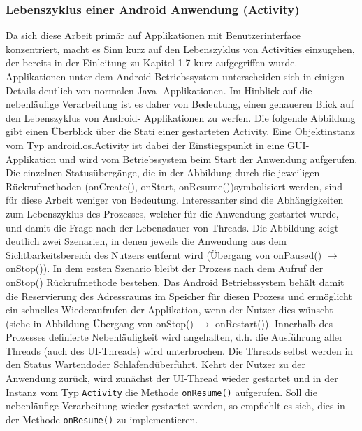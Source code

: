 \documentclass[12pt,oneside,a4paper,bibtotoc,liststotoc]{scrreprt}
\begin{document}
\subsubsection{Lebenszyklus einer Android Anwendung (Activity)}
Da sich diese Arbeit primär auf Applikationen mit Benutzerinterface konzentriert, macht es Sinn kurz auf den Lebenszyklus von Activities einzugehen, der bereits in der Einleitung zu Kapitel 1.7 kurz aufgegriffen wurde.
Applikationen unter dem Android Betriebssystem unterscheiden sich in einigen Details deutlich von normalen Java- Applikationen. Im Hinblick auf die nebenläufige Verarbeitung ist es daher von Bedeutung, einen genaueren Blick auf den Lebenszyklus von Android- Applikationen zu werfen. Die folgende Abbildung gibt einen Überblick über die Stati einer gestarteten Activity. Eine Objektinstanz vom Typ android.os.Activity ist dabei der Einstiegspunkt in eine GUI-Applikation und wird vom Betriebssystem beim Start der Anwendung aufgerufen. Die einzelnen Statusübergänge, die in der Abbildung durch die jeweiligen Rückrufmethoden (onCreate(), onStart, onResume())symbolisiert werden,  sind für diese Arbeit weniger von Bedeutung. Interessanter sind die Abhängigkeiten zum Lebenszyklus des Prozesses, welcher für die Anwendung gestartet wurde, und damit die Frage nach der Lebensdauer von Threads. Die Abbildung zeigt deutlich zwei Szenarien, in denen jeweils die Anwendung aus dem Sichtbarkeitsbereich des Nutzers entfernt wird (Übergang von onPaused() $\rightarrow$  onStop()). In dem ersten Szenario bleibt der Prozess nach dem Aufruf der onStop() Rückrufmethode bestehen. Das Android Betriebssystem behält damit die Reservierung des Adressraums im Speicher für diesen Prozess und ermöglicht ein schnelles Wiederaufrufen der Applikation, wenn der Nutzer dies wünscht (siehe in Abbildung Übergang von onStop() $\rightarrow$   onRestart()). Innerhalb des Prozesses definierte Nebenläufigkeit wird angehalten, d.h. die Ausführung aller Threads (auch des UI-Threads) wird unterbrochen. Die Threads selbst werden in den Status \glqq Wartend\grqq oder \glqq Schlafend\grqq überführt. Kehrt der Nutzer zu der Anwendung zurück, wird zunächst der UI-Thread wieder gestartet und in der Instanz vom Typ \texttt{Activity} die Methode \texttt{onResume()} aufgerufen. Soll die nebenläufige Verarbeitung wieder gestartet werden, so empfiehlt es sich, dies in der Methode \texttt{onResume()} zu implementieren.
\end{document}
